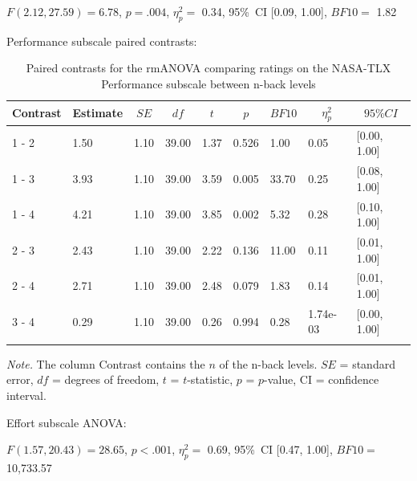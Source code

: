 \documentclass[
  man,floatsintext]{apa6}
\begin{document}
\(F(2.12, 27.59) = 6.78\), \(p = .004\), \(\eta_{p}^{2}=\) 0.34, 95\%~CI {[}0.09, 1.00{]}, \(BF10=\) 1.82

Performance subscale paired contrasts:

\begin{table}[H]

\begin{center}
\begin{threeparttable}

\caption{\label{tab:unnamed-chunk-5}Paired contrasts for the rmANOVA comparing ratings on the NASA-TLX Performance subscale between n-back levels}

\begin{tabular}{lllllllll}
\toprule
Contrast & \multicolumn{1}{c}{Estimate} & \multicolumn{1}{c}{$SE$} & \multicolumn{1}{c}{$df$} & \multicolumn{1}{c}{$t$} & \multicolumn{1}{c}{$p$} & \multicolumn{1}{c}{$BF10$} & \multicolumn{1}{c}{$\eta_{p}^{2}$} & \multicolumn{1}{c}{$95\% CI$}\\
\midrule
1 - 2 & 1.50 & 1.10 & 39.00 & 1.37 & 0.526 & 1.00 & 0.05 & {}[0.00, 1.00]\\
1 - 3 & 3.93 & 1.10 & 39.00 & 3.59 & 0.005 & 33.70 & 0.25 & {}[0.08, 1.00]\\
1 - 4 & 4.21 & 1.10 & 39.00 & 3.85 & 0.002 & 5.32 & 0.28 & {}[0.10, 1.00]\\
2 - 3 & 2.43 & 1.10 & 39.00 & 2.22 & 0.136 & 11.00 & 0.11 & {}[0.01, 1.00]\\
2 - 4 & 2.71 & 1.10 & 39.00 & 2.48 & 0.079 & 1.83 & 0.14 & {}[0.01, 1.00]\\
3 - 4 & 0.29 & 1.10 & 39.00 & 0.26 & 0.994 & 0.28 & 1.74e-03 & {}[0.00, 1.00]\\
\bottomrule
\addlinespace
\end{tabular}

\begin{tablenotes}[para]
\normalsize{\textit{Note.} The column Contrast contains the $n$ of the n-back levels. $SE$ = standard error, $df$ = degrees of freedom, $t$ = $t$-statistic, $p$ = $p$-value, CI = confidence interval.}
\end{tablenotes}

\end{threeparttable}
\end{center}

\end{table}

\newpage

Effort subscale ANOVA:

\(F(1.57, 20.43) = 28.65\), \(p < .001\), \(\eta_{p}^{2}=\) 0.69, 95\%~CI {[}0.47, 1.00{]}, \(BF10=\) 10,733.57
\end{document}
